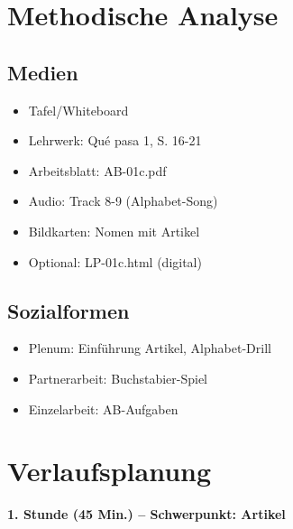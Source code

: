 \documentclass[11pt,a4paper]{article}
\newcommand{\lehrwerk}{Qué pasa 1}
\newcommand{\lehrwerkseite}{S. 16-21}
\begin{document}
\section{Methodische Analyse}

\subsection{Medien}
\begin{itemize}
    \item Tafel/Whiteboard
    \item Lehrwerk: \lehrwerk, \lehrwerkseite
    \item Arbeitsblatt: AB-01c.pdf
    \item Audio: Track 8-9 (Alphabet-Song)
    \item Bildkarten: Nomen mit Artikel
    \item Optional: LP-01c.html (digital)
\end{itemize}

\subsection{Sozialformen}
\begin{itemize}
    \item Plenum: Einführung Artikel, Alphabet-Drill
    \item Partnerarbeit: Buchstabier-Spiel
    \item Einzelarbeit: AB-Aufgaben
\end{itemize}

\section{Verlaufsplanung}

\textbf{1. Stunde (45 Min.) -- Schwerpunkt: Artikel}
\end{document}
